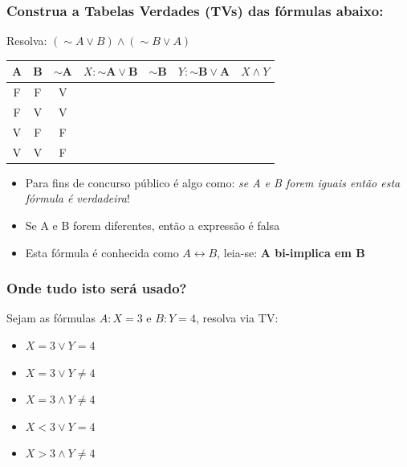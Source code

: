 \documentclass{beamer}
\begin{document}
\begin{frame}
\frametitle{Construa a Tabelas Verdades (TVs) das fórmulas abaixo:}


\begin{block}{Resolva: $(\sim A \vee B) \wedge (\sim B \vee A) $}
\begin{center}

	\begin{tabular}{|c|c|c|c|c|c|c|}
	\hline 	\hline
	$\mathbf{A}$ & $\mathbf{B}$ & $\mathbf{\sim A}$ & $X:\mathbf{\sim A \vee B}$ & $\mathbf{\sim B}$ & $Y:\mathbf{\sim B \vee A}$ & $X \wedge Y $ \\
	\hline
	F & F & V &  &  &  &   \\	
	\hline
	F & V & V &  &  &  &   \\
	\hline
	V & F & F &  &  &  &   \\
	\hline
	V & V & F &  &  &  &   \\
	\hline 	\hline
	\end{tabular}
\end{center}
  
\begin{itemize}
   \item Para fins de concurso público é algo como: \textit{se A e B forem iguais então esta fórmula é verdadeira}!
  \item Se A e B forem diferentes, então a expressão é falsa
    \item  Esta fórmula é conhecida como $A \leftrightarrow  B$, leia-se: \textbf{A bi-implica em B}

  \end{itemize}
  \end{block}


\end{frame}




\begin{frame}
\frametitle{Onde tudo isto será usado?}


\begin{block}{Sejam as fórmulas  $A:X=3$ e $B:Y=4$, resolva via TV: }

\begin{itemize}

  \item   $X = 3 \vee   Y = 4$
    \item $X = 3 \vee   Y \neq 4$
    \item $X = 3 \wedge Y \neq 4$
    \item $X < 3 \vee   Y = 4$
    \item $X > 3 \wedge   Y \neq 4$

\end{itemize}

  \end{block}


\end{frame}
\end{document}
